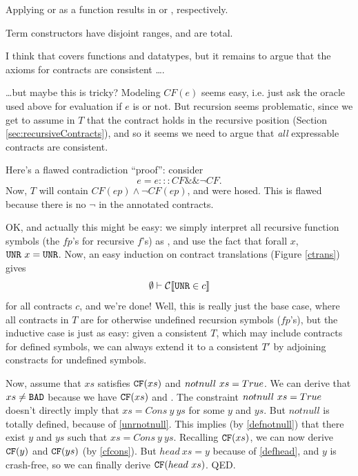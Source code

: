 \documentclass[preprint]{sigplanconf}
\begin{document}
{  Applying \unr{} or \bad{} as a function results in \unr{} or \bad{},
  respectively.

  Term constructors have disjoint ranges, and are total.

  I think that covers functions and datatypes, but it remains to argue
  that the axioms for contracts are consistent \ldots.  

  \ldots but maybe this is tricky?  Modeling $CF(e)$ seems easy,
  i.e. just ask the oracle used above for evaluation if $e$ is \bad{}
  or not.  But recursion seems problematic, since we get to assume in
  $T$ that the contract holds in the recursive position (Section
  \ref{sec:recursiveContracts}), and so it seems we need to argue that
  \emph{all} expressable contracts are consistent.

  Here's a flawed contradiction ``proof'': consider
  \[
  e = e ::: CF \&\& \lnot CF.
  \]
  Now, $T$ will contain $CF(ep) \land \lnot CF(ep)$, and were hosed.
  This is flawed because there is no $\lnot$ in the annotated
  contracts.

  OK, and actually this might be easy: we simply interpret all
  recursive function symbols (the $fp$'s for recursive $f$'s) as
  \unr{}, and use the fact that forall $x$, $\texttt{UNR}{}~x = \texttt{UNR}$.  Now,
  an easy induction on contract translations (Figure \ref{ctrans})
  gives \[ \emptyset \vdash \mathcal{C} \llbracket \texttt{UNR} \in c \rrbracket \] for all contracts $c$, and we're done!  Well, this is really just
  the base case, where all contracts in $T$ are for otherwise
  undefined recursion symbols ($fp$'s), but the inductive case is just
  as easy: given a consistent $T$, which may include contracts for
  defined symbols, we can always extend it to a consistent $T'$ by
  adjoining constracts for undefined symbols.

}

Now, assume that $xs$ satisfies
$\texttt{CF}(xs)$ and $notnull~xs = True$.  We can derive that $xs \neq \texttt{BAD}$
because we have $\texttt{CF}(xs)$ and . The constraint
$notnull~xs = True$ doesn't directly imply that $xs = Cons~y~ys$ for
some $y$ and $ys$. But $notnull$ is totally defined, because of
\eqref{unrnotnull}. This implies (by \eqref{defnotnull}) that there exist
$y$ and $ys$ such that $xs = Cons~y~ys$. Recalling $\texttt{CF}(xs)$, we can
now derive $\texttt{CF}(y)$ and $\texttt{CF}(ys)$ (by \eqref{cfcons}). But $head~xs =
y$ because of \eqref{defhead}, and $y$ is crash-free, so we can finally
derive $\texttt{CF}(head~xs)$. QED.
\end{document}
